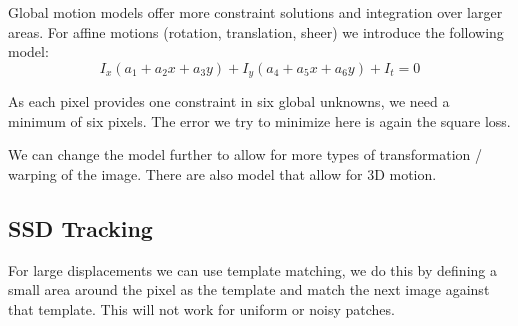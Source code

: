 Global motion models offer more constraint solutions and integration over larger areas. For affine motions (rotation, translation, sheer) we introduce the following model:
$$I_x (a_1 + a_2 x + a_3 y) + I_y (a_4 + a_5 x + a_6 y) + I_t = 0$$

As each pixel provides one constraint in six global unknowns, we need a minimum of six pixels. The error we try to minimize here is again the square loss. \medskip

We can change the model further to allow for more types of transformation / warping of the image. There are also model that allow for 3D motion.
 
 
\subsection{SSD Tracking}
 
For large displacements we can use template matching, we do this by defining a small area around the pixel as the template and match the next image against that template. This will not work for uniform or noisy patches.
 